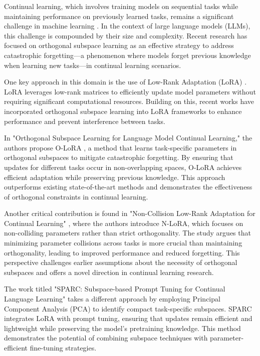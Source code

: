 \documentclass[conference]{IEEEtran}
\begin{document}
Continual learning, which involves training models on sequential tasks while maintaining performance on previously learned tasks, remains a significant challenge in machine learning \cite{bX}. In the context of large language models (LLMs), this challenge is compounded by their size and complexity. Recent research has focused on orthogonal subspace learning as an effective strategy to address catastrophic forgetting—a phenomenon where models forget previous knowledge when learning new tasks—in continual learning scenarios.

One key approach in this domain is the use of Low-Rank Adaptation (LoRA) \cite{bX}. LoRA leverages low-rank matrices to efficiently update model parameters without requiring significant computational resources. Building on this, recent works have incorporated orthogonal subspace learning into LoRA frameworks to enhance performance and prevent interference between tasks.

In "Orthogonal Subspace Learning for Language Model Continual Learning," the authors propose O-LoRA \cite{bX}, a method that learns task-specific parameters in orthogonal subspaces to mitigate catastrophic forgetting. By ensuring that updates for different tasks occur in non-overlapping spaces, O-LoRA achieves efficient adaptation while preserving previous knowledge. This approach outperforms existing state-of-the-art methods and demonstrates the effectiveness of orthogonal constraints in continual learning.

Another critical contribution is found in "Non-Collision Low-Rank Adaptation for Continual Learning" \cite{bX}, where the authors introduce N-LoRA, which focuses on non-colliding parameters rather than strict orthogonality. The study argues that minimizing parameter collisions across tasks is more crucial than maintaining orthogonality, leading to improved performance and reduced forgetting. This perspective challenges earlier assumptions about the necessity of orthogonal subspaces and offers a novel direction in continual learning research.

The work titled "SPARC: Subspace-based Prompt Tuning for Continual Language Learning" \cite{bX} takes a different approach by employing Principal Component Analysis (PCA) to identify compact task-specific subspaces. SPARC integrates LoRA with prompt tuning, ensuring that updates remain efficient and lightweight while preserving the model's pretraining knowledge. This method demonstrates the potential of combining subspace techniques with parameter-efficient fine-tuning strategies.
\end{document}
